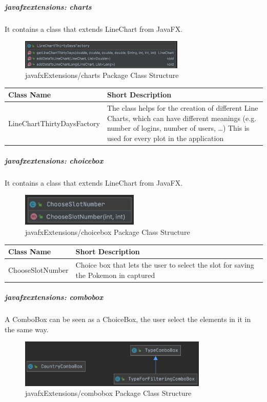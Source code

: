 \subparagraph{javafxextensions: charts}
It contains a class that extends LineChart from JavaFX.
\begin{figure}[H]
	\centering
	\includegraphics[width=0.7\textwidth]{img/javafx_charts_package.png}
	\caption{javafxExtensions/charts Package Class Structure}
\end{figure}
\begin{center}
	\begin{tabular}{| m{14em} | m{19em} |} 
		\hline
		\textbf{Class Name} & \textbf{Short Description} \\ [0.5ex] 
		\hline
		LineChartThirtyDaysFactory & The class helps for the creation of different Line Charts, which can have different meanings (e.g. number of logins, number of users, …)  This is used for every plot in the application\\ 
		\hline
	\end{tabular}
\end{center}
\subparagraph{javafxextensions: choicebox}
It contains a class that extends LineChart from JavaFX.
\begin{figure}[H]
	\centering
	\includegraphics[width=0.5\textwidth]{img/javafx_choicebox_package.png}
	\caption{javafxExtensions/choicebox Package Class Structure}
\end{figure}
\begin{center}
	\begin{tabular}{| m{14em} | m{19em} |} 
		\hline
		\textbf{Class Name} & \textbf{Short Description} \\ [0.5ex] 
		\hline
		ChooseSlotNumber & Choice box that lets the user to select the slot for saving the Pokemon in captured\\ 
		\hline
	\end{tabular}
\end{center}
\subparagraph{javafxextensions: combobox}
A ComboBox can be seen as a ChoiceBox, the user select the elements in it in the same way.
\begin{figure}[H]
	\centering
	\includegraphics[width=0.8\textwidth]{img/javafx_combobox_package.png}
	\caption{javafxExtensions/combobox Package Class Structure}
\end{figure}
